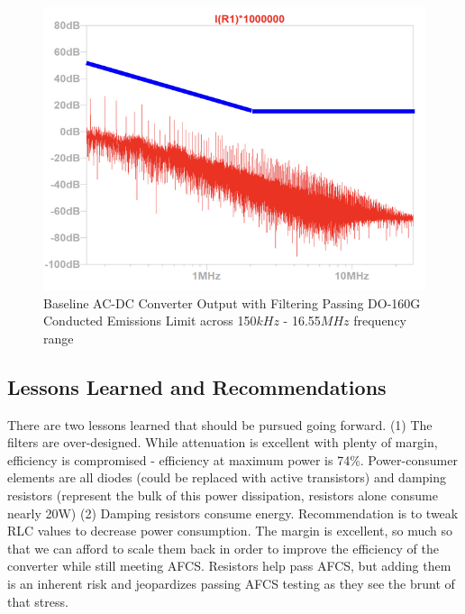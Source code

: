 \documentclass[conference]{IEEEtran}
\begin{document}
\begin{figure}[h]
    \centering
    \includegraphics[width=1.0\linewidth]{output_filter_emissions_limit.png}
    \caption{Baseline AC-DC Converter Output with Filtering Passing DO-160G Conducted Emissions Limit across 150$kHz$ - 16.55$MHz$ frequency range}
    \label{fig:output_filter_emissions_limit_waveform}
\end{figure}

\subsection{Lessons Learned and Recommendations}
There are two lessons learned that should be pursued going forward. (1) The filters are over-designed. While attenuation is excellent with plenty of margin, efficiency is compromised - efficiency at maximum power is 74\%. Power-consumer elements are all diodes (could be replaced with active transistors) and damping resistors (represent the bulk of this power dissipation, resistors alone consume nearly 20W)
(2) Damping resistors consume energy. Recommendation is to tweak RLC values to decrease power consumption. The margin is excellent, so much so that we can afford to scale them back in order to improve the efficiency of the converter while still meeting AFCS. Resistors help pass AFCS, but adding them is an inherent risk and jeopardizes passing AFCS testing as they see the brunt of that stress.

\nocite{*}



\newpage
\end{document}
